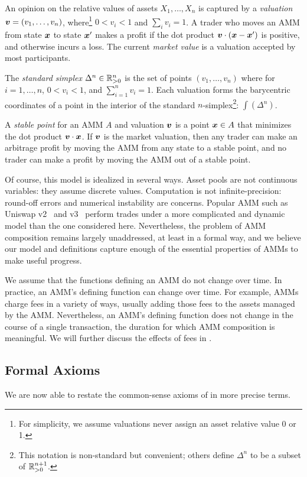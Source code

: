 An opinion on the relative values of assets $X_1, \ldots, X_n$ is
captured by a \emph{valuation} ${\boldsymbol v} = (v_1, \ldots, v_n)$,
where\footnote{For simplicity, we assume valuations never assign an asset relative value 0 or 1.} $0 < v_i < 1$ and $\sum_i v_i = 1$.
A trader who moves an AMM from state ${\boldsymbol x}$ to state ${\boldsymbol x}'$
makes a profit if the dot product ${\boldsymbol v} \cdot ({\boldsymbol x} - {\boldsymbol x}')$ is positive,
and otherwise incurs a loss.
The current \emph{market value} is a valuation accepted by most participants.

The \emph{standard simplex} $\Delta^n \in \mathbb{R}_{>0}^n$ is the set of points
$(v_1,\ldots,v_n)$ where for $i=1,\ldots,n$, $0 < v_i < 1$, and $\sum^n_{i=1} v_i = 1$.
Each valuation forms the barycentric coordinates of a point
in the interior of the standard $n$-simplex\footnote{This notation is non-standard but convenient; others define $\Delta^n$ to be a subset of $\mathbb{R}_{>0}^{n+1}$.}: $\int(\Delta^n)$.

A \emph{stable point} for an AMM $A$ and valuation ${\boldsymbol v}$
is a point ${\boldsymbol x} \in A$ that minimizes the dot product ${\boldsymbol v} \cdot {\boldsymbol x}$.
If ${\boldsymbol v}$ is the market valuation,
then any trader can make an arbitrage profit
by moving the AMM from any state to a stable point,
and no trader can make a profit by moving the AMM out of a stable point.

Of course, this model is idealized in several ways.
Asset pools are not continuous variables: they assume discrete values.
Computation is not infinite-precision:
round-off errors and numerical instability are concerns.
Popular AMM such as Uniswap v2~\cite{uniswapv2} and v3~\cite{uniswapv3} perform trades under a more complicated and dynamic model than the one
considered here.
Nevertheless, the problem of AMM composition remains largely unaddressed,
at least in a formal way,
and we believe our model and definitions capture enough of the
essential properties of AMMs to make useful progress.

We assume that the functions defining an AMM do not change over time.
In practice, an AMM's defining function can change over time.
For example, AMMs charge fees in a variety of ways,
usually adding those fees to the assets managed by the AMM.
Nevertheless, an AMM's defining function does not
change in the course of a single transaction,
the duration for which AMM composition is meaningful.
We will further discuss the effects of fees in .

\subsection{Formal Axioms}
We are now able to restate the common-sense axioms of
 in more precise terms.

